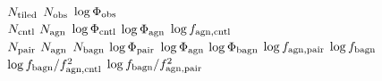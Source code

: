              $N_{\rm tiled}$	
               $N_{\rm obs}$	
       $\log \Phi_{\rm obs}$
\hline
{}\\
\hline               
	      $N_{\rm cntl}$	
	       $N_{\rm agn}$	
      $\log \Phi_{\rm cntl}$	
       $\log \Phi_{\rm agn}$	
     $\log f_{\rm agn,cntl}$	
\hline
{}\\
\hline
              $N_{\rm pair}$	
               $N_{\rm agn}$
              $N_{\rm bagn}$	
      $\log \Phi_{\rm pair}$	
       $\log \Phi_{\rm agn}$
      $\log \Phi_{\rm bagn}$	
     $\log f_{\rm agn,pair}$
         $\log f_{\rm bagn}$	      
\hline
{}\\
\hline
$\log f_{\rm bagn}/f_{\rm agn,cntl}^2$        
$\log f_{\rm bagn}/f_{\rm agn,pair}^2$
